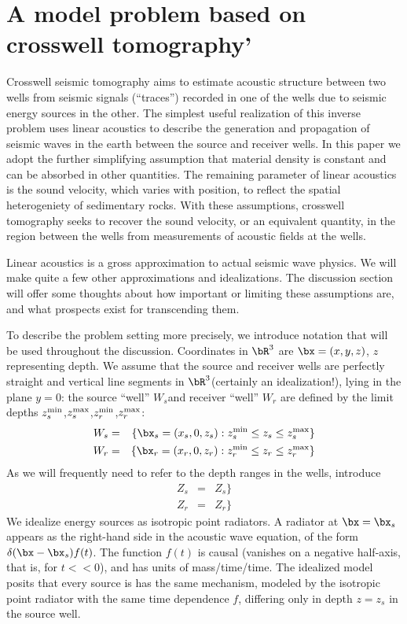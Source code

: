 \section{A model problem based on crosswell tomography'}

Crosswell seismic tomography  aims to  estimate acoustic structure between
two wells from seismic signals (``traces'') recorded in one of the wells due to seismic
energy sources in the other. The simplest useful realization of this
inverse problem uses linear acoustics to describe the generation and
propagation of seismic waves in the earth between the source and
receiver wells. In this paper we adopt the further simplifying
assumption that material density is constant and can be absorbed in
other quantities. The remaining parameter of linear acoustics is the
sound velocity, which varies with position, to reflect the
spatial heterogeniety of sedimentary rocks. With these assumptions,
crosswell tomography seeks to recover the sound velocity, or an
equivalent quantity, in the region
between the wells from measurements of acoustic fields at the wells.

Linear acoustics is a gross approximation to actual seismic wave
physics. We will make quite a few other approximations and
idealizations. The discussion section will offer some thoughts about
how important or limiting these assumptions are, and what prospects
exist for transcending them. 

To describe the problem setting more precisely, we introduce
notation that will be used throughout the discussion. Coordinates in
$\bR^3$ are $\bx=(x,y,z)$, $z$ representing depth. We assume that the
source and receiver wells are 
perfectly straight and vertical line segments in $\bR^3$(certainly an
idealization!), lying in the plane $y=0$: the
source ``well'' $W_s$and receiver ``well'' $W_r$ are defined by the
limit depths $z_s^{\rm min}$,$z_s^{\rm max}$,$z_r^{\rm min}$,$z_r^{\rm
  max}$: 
\begin{eqnarray}
\label{eqn:wells} 
W_s & = & \{\bx_s = (x_s,0,z_s): z_s^{\rm min} \le z_s \le z_s^{\rm 
          max}\} \nonumber \\
W_r & = & \{\bx_r = (x_r,0,z_r): z_r^{\rm min} \le z_r \le z_r^{\rm 
          max}\} 
\end{eqnarray}
As we will frequently need to refer to the depth ranges in the wells,
introduce
\begin{eqnarray}
\label{eqn:depths} 
Z_s & = & Z_s\} \nonumber \\
Z_r & = & Z_r\} 
\end{eqnarray}
We idealize energy sources as isotropic point radiators. A radiator at
$\bx=\bx_s$ appears as the right-hand side in the acoustic wave
equation, of the form $\delta(\bx-\bx_s)f(t)$. 
The function $f(t)$ is causal (vanishes on a negative half-axis, that
is,  for $t<<0$), and has units of
mass/time/time. The idealized model posits that every
source is has the same mechanism, modeled by the
isotropic point radiator with the same time dependence $f$, differing only in
depth $z=z_s$ in the source well.

